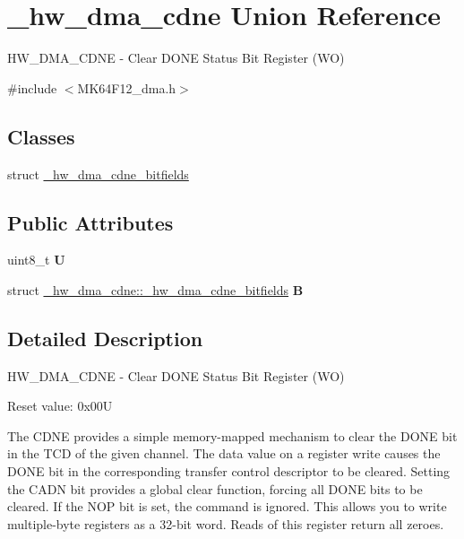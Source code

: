 \hypertarget{union__hw__dma__cdne}{}\section{\+\_\+hw\+\_\+dma\+\_\+cdne Union Reference}
\label{union__hw__dma__cdne}


H\+W\+\_\+\+D\+M\+A\+\_\+\+C\+D\+NE -\/ Clear D\+O\+NE Status Bit Register (WO)  




{\ttfamily \#include $<$M\+K64\+F12\+\_\+dma.\+h$>$}

\subsection*{Classes}
\begin{DoxyCompactItemize}
\item 
struct \hyperlink{struct__hw__dma__cdne_1_1__hw__dma__cdne__bitfields}{\+\_\+hw\+\_\+dma\+\_\+cdne\+\_\+bitfields}
\end{DoxyCompactItemize}
\subsection*{Public Attributes}
\begin{DoxyCompactItemize}
\item 
uint8\+\_\+t {\bfseries U}\hypertarget{union__hw__dma__cdne_a39d906a18caa93c240e3d0e9f0675e65}{}\label{union__hw__dma__cdne_a39d906a18caa93c240e3d0e9f0675e65}

\item 
struct \hyperlink{struct__hw__dma__cdne_1_1__hw__dma__cdne__bitfields}{\+\_\+hw\+\_\+dma\+\_\+cdne\+::\+\_\+hw\+\_\+dma\+\_\+cdne\+\_\+bitfields} {\bfseries B}\hypertarget{union__hw__dma__cdne_a22807da0a5f436c154efc6e07aba57c0}{}\label{union__hw__dma__cdne_a22807da0a5f436c154efc6e07aba57c0}

\end{DoxyCompactItemize}


\subsection{Detailed Description}
H\+W\+\_\+\+D\+M\+A\+\_\+\+C\+D\+NE -\/ Clear D\+O\+NE Status Bit Register (WO) 

Reset value\+: 0x00U

The C\+D\+NE provides a simple memory-\/mapped mechanism to clear the D\+O\+NE bit in the T\+CD of the given channel. The data value on a register write causes the D\+O\+NE bit in the corresponding transfer control descriptor to be cleared. Setting the C\+A\+DN bit provides a global clear function, forcing all D\+O\+NE bits to be cleared. If the N\+OP bit is set, the command is ignored. This allows you to write multiple-\/byte registers as a 32-\/bit word. Reads of this register return all zeroes. 

